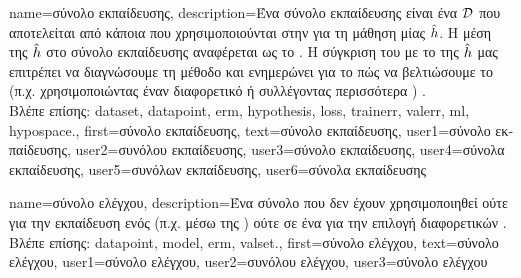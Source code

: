 {name={\foreignlanguage{greek}{σύνολο εκπαίδευσης}},
	description={\foreignlanguage{greek}{Ένα σύνολο εκπαίδευσης είναι ένα}  
		$\mathcal{D}$ \foreignlanguage{greek}{που αποτελείται από κάποια}  \foreignlanguage{greek}{που 
		χρησιμοποι\-ού\-νται στην}  \foreignlanguage{greek}{για τη μάθηση μίας}  $\hat{h}$. 
		\foreignlanguage{greek}{Η μέση}  \foreignlanguage{greek}{της $\hat{h}$ στο σύνολο εκπαίδευσης 
		αναφέρεται ως το} . \foreignlanguage{greek}{Η σύγκριση του}  \foreignlanguage{greek}{με το}  
		 \foreignlanguage{greek}{της $\hat{h}$ μας επιτρέπει να διαγνώσουμε τη μέθοδο}  
		\foreignlanguage{greek}{και ενημερώνει για το πώς να βελτιώσουμε το}  
		\foreignlanguage{greek}{(π.χ. χρησιμοποιώντας έναν διαφορετικό}  
		\foreignlanguage{greek}{ή συλλέγοντας περισσότερα} ) \cite[Sec. 6.6]{MLBasics}.\\
		\foreignlanguage{greek}{Βλέπε επίσης:} \gls{dataset}, \gls{datapoint}, \gls{erm}, \gls{hypothesis}, \gls{loss}, \gls{trainerr}, \gls{valerr}, \gls{ml}, \gls{hypospace}.},
	first={\foreignlanguage{greek}{σύνολο εκπαίδευσης}},
	text={\foreignlanguage{greek}{σύ\-νο\-λο εκ\-παί\-δευ\-σης}},
	user1={\foreignlanguage{greek}{σύνολο εκπαίδευσης}}, %
	user2={\foreignlanguage{greek}{συνόλου εκπαίδευσης}}, %
	user3={\foreignlanguage{greek}{σύνολο εκπαί\-δευσης}}, %
	user4={\foreignlanguage{greek}{σύνολα εκπαίδευσης}}, %
	user5={\foreignlanguage{greek}{συνόλων εκπαί\-δευ\-σης}}, %
	user6={\foreignlanguage{greek}{σύνολα εκπαίδευσης}} %
}

{name={\foreignlanguage{greek}{σύνολο ελέγχου}},
	description={\foreignlanguage{greek}{Ένα σύνολο}  
		\foreignlanguage{greek}{που δεν έχουν χρησιμοποιηθεί ούτε για την εκπαίδευση ενός}  
		(\foreignlanguage{greek}{π.χ. μέσω της} ) \foreignlanguage{greek}{ούτε σε ένα}  
		\foreignlanguage{greek}{για την επιλογή διαφορετικών} .\\
		\foreignlanguage{greek}{Βλέπε επίσης:} \gls{datapoint}, \gls{model}, \gls{erm}, \gls{valset}.},
	first={\foreignlanguage{greek}{σύνολο ελέγχου}},
	text={\foreignlanguage{greek}{σύνολο ελέγχου}}, 
	user1={\foreignlanguage{greek}{σύνολο ελέγχου}}, %
	user2={\foreignlanguage{greek}{συνόλου ελέγχου}}, %
	user3={\foreignlanguage{greek}{σύνολο ελέγχου}} %
}

